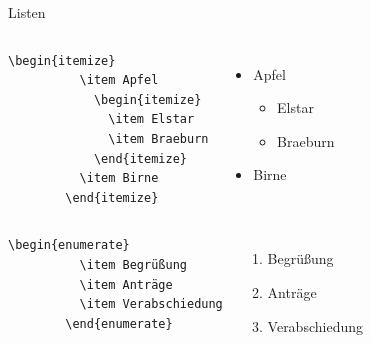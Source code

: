 \begin{Frame}[fragile]{Listen}
  \begin{columns}
    \column{5cm}
      \begin{lstlisting}[gobble=8]
        \begin{itemize}
          \item Apfel
            \begin{itemize}
              \item Elstar
              \item Braeburn
            \end{itemize}
          \item Birne
        \end{itemize}
      \end{lstlisting}
    \column{4cm}
      \begin{itemize}
        \item Apfel
          \begin{itemize}
            \item Elstar
            \item Braeburn
          \end{itemize}
        \item Birne
      \end{itemize}
  \end{columns}
  
  \begin{columns}
    \column{5cm}
      \begin{lstlisting}[gobble=8]
        \begin{enumerate}
          \item Begrüßung
          \item Anträge
          \item Verabschiedung
        \end{enumerate}
      \end{lstlisting}
    \column{4cm}
      \begin{enumerate}
        \item Begrüßung
        \item Anträge
        \item Verabschiedung
      \end{enumerate}
  \end{columns}
\end{Frame}


